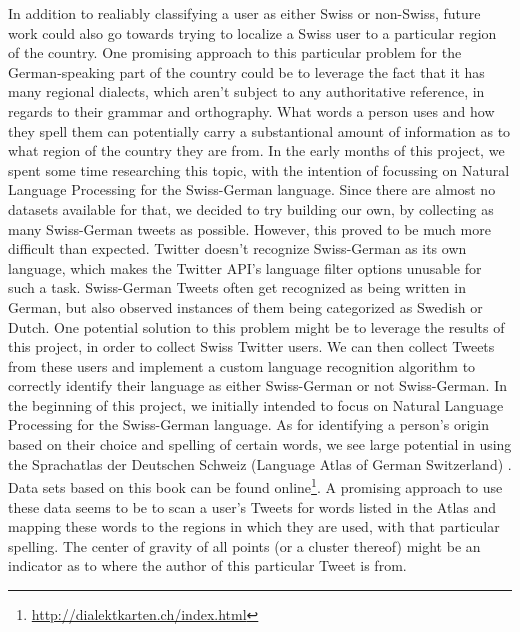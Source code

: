 \documentclass[10pt,a4paper]{article}
\begin{document}
In addition to realiably classifying a user as either Swiss or non-Swiss, future work could also go towards trying to localize a Swiss user to a particular region of the country. One promising approach to this particular problem for the German-speaking part of the country could be to leverage the fact that it has many regional dialects, which aren't subject to any authoritative reference, in regards to their grammar and orthography. What words a person uses and how they spell them can potentially carry a substantional amount of information as to what region of the country they are from. In the early months of this project, we spent some time researching this topic, with the intention of focussing on Natural Language Processing for the Swiss-German language. Since there are almost no datasets available for that, we decided to try building our own, by collecting as many Swiss-German tweets as possible. However, this proved to be much more difficult than expected. Twitter doesn't recognize Swiss-German as its own language, which makes the Twitter API's language filter options unusable for such a task. Swiss-German Tweets often get recognized as being written in German, but also observed instances of them being categorized as Swedish or Dutch. One potential solution to this problem might be to leverage the results of this project, in order to collect Swiss Twitter users. We can then collect Tweets from these users and implement a custom language recognition algorithm to correctly identify their language as either Swiss-German or not Swiss-German. In the beginning of this project, we initially intended to focus on Natural Language Processing for the Swiss-German language. As for identifying a person's origin based on their choice and spelling of certain words, we see large potential in using the Sprachatlas der Deutschen Schweiz (Language Atlas of German Switzerland) \cite{sprachatlas_der_deutschen_schweiz}. Data sets based on this book can be found online\footnote{\href{http://dialektkarten.ch/index.html}{http://dialektkarten.ch/index.html}}. A promising approach to use these data seems to be to scan a user's Tweets for words listed in the Atlas and mapping these words to the regions in which they are used, with that particular spelling. The center of gravity of all points (or a cluster thereof) might be an indicator as to where the author of this particular Tweet is from.
\end{document}
